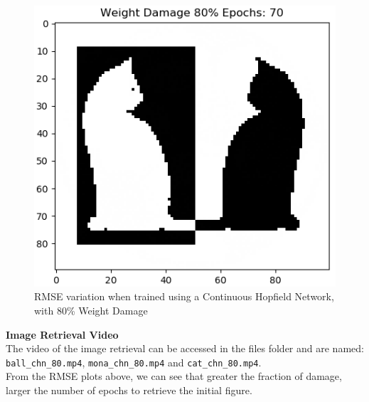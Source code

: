 \documentclass[12pt,a4paper]{article}
\newcommand{\noi}{\noindent}
\def\tt#1{\texttt{#1}}
\begin{document}
\begin{figure}[H]
\includegraphics[scale=0.34]{images/cat_chn_80_end.png}
\caption{RMSE variation when trained using a Continuous Hopfield Network, with 80\% Weight Damage}
\end{figure}

\noi
\textbf{Image Retrieval Video}\\
The video of the image retrieval can be accessed in the files folder and are named: \tt{ball\_chn\_80.mp4}, \tt{mona\_chn\_80.mp4} and \tt{cat\_chn\_80.mp4}.\\

\noi
From the RMSE plots above, we can see that greater the fraction of damage, larger the number of epochs to retrieve the initial figure.
\end{document}
